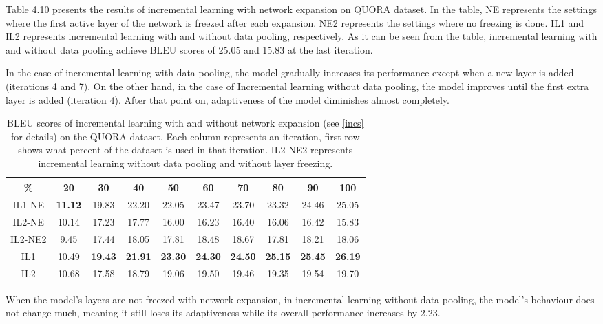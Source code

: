Table 4.10 presents the results of incremental learning with network expansion on QUORA dataset. In the table, NE represents the settings where the first active layer of the network is freezed after each expansion. NE2 represents the settings where no freezing is done. IL1 and IL2 represents incremental learning with and without data pooling, respectively. As it can be seen from the table, incremental learning with and without data pooling achieve BLEU scores of 25.05 and 15.83 at the last iteration.

In the case of incremental learning with data pooling, the model gradually increases its performance except when a new layer is added (iterations 4 and 7). On the other hand, in the case of Incremental learning without data pooling, the model improves until the first extra layer is added (iteration 4). After that point on, adaptiveness of the model diminishes almost completely.

\begin{table}[t]
\centering
\small
 \begin{tabular}{|c | c | c | c | c | c | c | c | c | c |} 
 \hline
 \% & 20 & 30 & 40 & 50 & 60 & 70 & 80 & 90 & 100 \\ [0.5ex] 
 \hline
  IL1-NE & \textbf{11.12} & 19.83 & 22.20 & 22.05 & 23.47 & 23.70 & 23.32 & 24.46 & 25.05  \\ 
 \hline
  IL2-NE & 10.14 & 17.23 & 17.77 & 16.00 & 16.23 & 16.40 & 16.06 & 16.42 & 15.83 \\ 
 \hline
  IL2-NE2 & 9.45 & 17.44 & 18.05 & 17.81 & 18.48 & 18.67 & 17.81 & 18.21 & 18.06 \\ 
 \hline
  IL1 & 10.49 &  \textbf{19.43} & \textbf{21.91} &  \textbf{23.30} &  \textbf{24.30} &  \textbf{24.50} &  \textbf{25.15} &  \textbf{25.45} &  \textbf{26.19}  \\ 
 \hline
  IL2 &  10.68 & 17.58 & 18.79 & 19.06 & 19.50 & 19.46 & 19.35 & 19.54 & 19.70 \\ 
 \hline
\end{tabular}
\caption{BLEU scores of incremental learning with and without network expansion (see \ref{incs} for details) on the QUORA dataset. Each column represents an iteration, first row shows what percent of the dataset is used in that iteration. IL2-NE2 represents incremental learning without data pooling and without layer freezing.}
\end{table}

When the model's layers are not freezed with network expansion, in incremental learning without data pooling, the model's behaviour does not change much, meaning it still loses its adaptiveness while its overall performance increases by 2.23.

